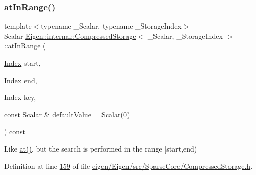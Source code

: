\subsubsection{\texorpdfstring{at\+In\+Range()}{atInRange()}\hspace{0.1cm}{\footnotesize\ttfamily [1/2]}}
{\footnotesize\ttfamily template$<$typename \+\_\+\+Scalar, typename \+\_\+\+Storage\+Index$>$ \\
Scalar \hyperlink{class_eigen_1_1internal_1_1_compressed_storage}{Eigen\+::internal\+::\+Compressed\+Storage}$<$ \+\_\+\+Scalar, \+\_\+\+Storage\+Index $>$\+::at\+In\+Range (\begin{DoxyParamCaption}\item[{\hyperlink{namespace_eigen_a62e77e0933482dafde8fe197d9a2cfde}{Index}}]{start,  }\item[{\hyperlink{namespace_eigen_a62e77e0933482dafde8fe197d9a2cfde}{Index}}]{end,  }\item[{\hyperlink{namespace_eigen_a62e77e0933482dafde8fe197d9a2cfde}{Index}}]{key,  }\item[{const Scalar \&}]{default\+Value = {\ttfamily Scalar(0)} }\end{DoxyParamCaption}) const\hspace{0.3cm}{\ttfamily [inline]}}

Like \hyperlink{class_eigen_1_1internal_1_1_compressed_storage_a0fe151c0217177fd43df764e8e0cdec2}{at()}, but the search is performed in the range \mbox{[}start,end) 

Definition at line \hyperlink{eigen_2_eigen_2src_2_sparse_core_2_compressed_storage_8h_source_l00159}{159} of file \hyperlink{eigen_2_eigen_2src_2_sparse_core_2_compressed_storage_8h_source}{eigen/\+Eigen/src/\+Sparse\+Core/\+Compressed\+Storage.\+h}.

\mbox{\label{class_eigen_1_1internal_1_1_compressed_storage_a70c2745dd270aaa44b415ec2e9bf2ae0}} 
